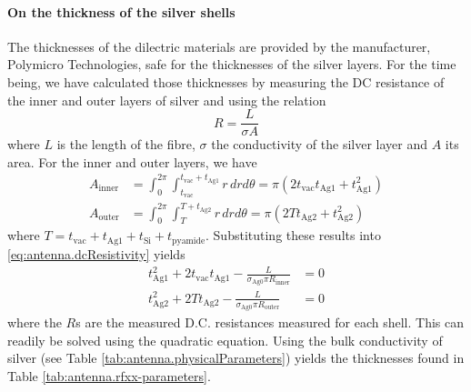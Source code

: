 \paragraph*{On the thickness of the silver shells}
The thicknesses of the dilectric materials are provided by the manufacturer, 
Polymicro Technologies, safe for the thicknesses of the silver layers. 
For the time being, we have calculated those thicknesses by measuring
the DC resistance of the inner and outer layers of silver and
using the relation \cite[p.~204]{CHE1989}
  \begin{equation}
    \label{eq:antenna.dcResistivity}
    R = \frac{L}{\sigma A}
  \end{equation}
where $L$ is the length of the fibre, $\sigma$ the conductivity of the silver
layer and $A$ its area. For the inner and outer layers, we have
  \begin{align}
    A_\text{inner}	&= \int_0^{2\pi}\int_{t_\text{vac}}^{t_\text{vac}+t_\text{Ag1}}r\,dr d\theta= \pi\left(2t_\text{vac}t_\text{Ag1}+t_\text{Ag1}^2\right)	\\
    A_\text{outer}	&= \int_0^{2\pi}\int_T^{T+t_\text{Ag2}}r\,dr d\theta = \pi\left(2Tt_\text{Ag2}+t_\text{Ag2}^2\right)
  \end{align}
where $T=t_\text{vac}+t_\text{Ag1}+t_\text{Si}+t_\text{pyamide}$. 
Substituting these results into \eqref{eq:antenna.dcResistivity}
yields
  \begin{subequations}
  \label{eq:antenna:thickGeneralEquations}
  \begin{align}  
   t_\text{Ag1}^2 + 2t_\text{vac}t_\text{Ag1}-\frac{L}{\sigma_\text{Ag0}\pi R_\text{inner}}	&=0	\\
   t_\text{Ag2}^2 + 2Tt_\text{Ag2}-\frac{L}{\sigma_\text{Ag0}\pi R_\text{outer}}			&=0
  \end{align}
  \end{subequations}
where the $R$s are the measured D.C. resistances measured for each shell. 
This can readily be solved using the quadratic equation. Using the bulk conductivity
of silver (see Table \ref{tab:antenna.physicalParameters}) yields the 
thicknesses found in Table \ref{tab:antenna.rfxx-parameters}.

